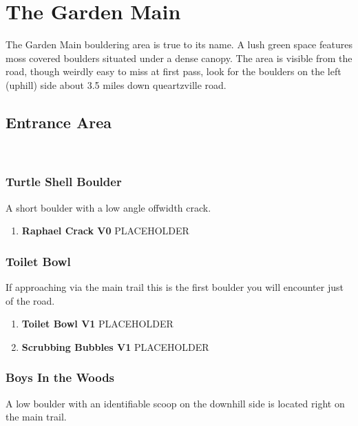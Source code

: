 \chapter{The Garden Main}\label{a:The Garden Main}
\lhead{\textcolor{\chapterColor}{\rule[-2pt]{\textwidth}{15pt}}}
The Garden Main bouldering area is true to its name. A lush green space features moss covered boulders situated under a dense canopy. The area is visible from the road, though weirdly easy to miss at first pass, look for the boulders on the left (uphill) side about 3.5 miles down queartzville road.

\section{Entrance Area}\label{sa:Entrance Area}
\

\subsection*{Turtle Shell Boulder}\label{bf:Turtle Shell Boulder}
A short boulder with a low angle offwidth crack.

\begin{enumerate}[]
	\item\label{rt:Raphael Crack} \colorbox{green!20}{\textbf{Raphael Crack V0  } }
	\newline PLACEHOLDER\
\end{enumerate}
\subsection*{Toilet Bowl}\label{bf:Toilet Bowl}
If approaching via the main trail this is the first boulder you will encounter just of the road.

\begin{enumerate}[resume]
	\item\label{rt:Toilet Bowl} \colorbox{green!20}{\textbf{Toilet Bowl V1  } }
	\newline PLACEHOLDER\
	\item\label{rt:Scrubbing Bubbles} \colorbox{green!20}{\textbf{Scrubbing Bubbles V1  } }
	\newline PLACEHOLDER\
\end{enumerate}
\subsection*{Boys In the Woods}\label{bf:Boys In the Woods}
A low boulder with an identifiable scoop on the downhill side is located right on the main trail.

